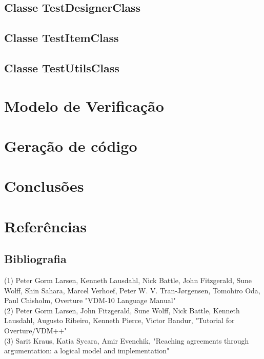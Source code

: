 \documentclass{article}
\begin{document}
\subsection{Classe TestDesignerClass}


\subsection{Classe TestItemClass}


\subsection{Classe TestUtilsClass}


\section{Modelo de Verificação}

\section{Geração de código}

\section{Conclusões}
\section{Referências}
\subsection{Bibliografia}
\noindent
(1) Peter Gorm Larsen, Kenneth Lausdahl, Nick Battle, John Fitzgerald, Sune Wolff, Shin Sahara, Marcel Verhoef, Peter W. V. Tran-Jørgensen, Tomohiro Oda, Paul Chisholm, Overture "VDM-10 Language Manual"\\

\noindent
(2) Peter Gorm Larsen, John Fitzgerald, Sune Wolff, Nick Battle, Kenneth Lausdahl, Augusto Ribeiro, Kenneth Pierce, Victor Bandur, "Tutorial for Overture/VDM++"\\

\noindent
(3) Sarit Kraus, Katia Sycara, Amir Evenchik, "Reaching agreements through argumentation: a logical model and implementation"\\
\end{document}
